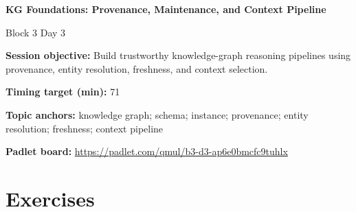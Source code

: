 \documentclass[11pt]{article}
\begin{document}
\begin{center}\LARGE\bfseries KG Foundations: Provenance, Maintenance, and Context Pipeline\end{center}

\begin{center}\large Block 3 Day 3\end{center}

\begin{tcolorbox}[colback=MidnightBlue!4,colframe=MidnightBlue,title={Session Overview},fonttitle=\bfseries,breakable]
\textbf{Session objective:} Build trustworthy knowledge-graph reasoning pipelines using provenance, entity resolution, freshness, and context selection.

\textbf{Timing target (min):} 71

\textbf{Topic anchors:} knowledge graph; schema; instance; provenance; entity resolution; freshness; context pipeline

\textbf{Padlet board:} \url{https://padlet.com/qmul/b3-d3-ap6e0bmcfc9tuhlx}
\end{tcolorbox}

\section*{Exercises}
\end{document}
